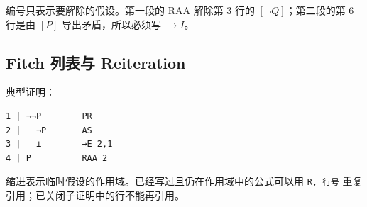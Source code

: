 编号只表示要解除的假设。第一段的 RAA 解除第 3 行的 $[\neg Q]$；第二段的第 6 行是由 $[P]$ 导出矛盾，所以必须写 $\to I$。

\subsection{Fitch 列表与 Reiteration}


典型证明：

\begin{verbatim}
1 | ¬¬P        PR
2 |   ¬P       AS
3 |   ⊥        →E 2,1
4 | P          RAA 2
\end{verbatim}


缩进表示临时假设的作用域。已经写过且仍在作用域中的公式可以用 \texttt{R, 行号} 重复引用；已关闭子证明中的行不能再引用。
